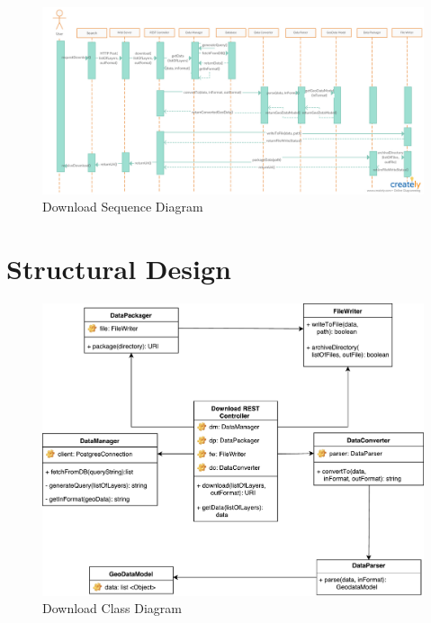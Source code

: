 \documentclass{article}
\begin{document}
	\begin{figure}[H]
		\begin{center}
			\caption{Download Sequence Diagram}
			\includegraphics[width=\textwidth]{images/download_sequence_diagram.jpg}
		\end{center}
	\end{figure}

	\clearpage
	
	\section{Structural Design}
	
	\begin{figure}[H]
		\begin{center}
			\caption{Download Class Diagram}
			\includegraphics[width=\textwidth]{images/class_diagram.pdf}
		\end{center}
	\end{figure}
	
	
\end{document}
